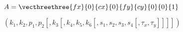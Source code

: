\documentclass{article}
\begin{document}
$A = \vecthreethree{fx}{0}{cx}{0}{fy}{cy}{0}{0}{1}$
\pagebreak

$(k_1, k_2, p_1, p_2[, k_3[, k_4, k_5, k_6 [, s_1, s_2, s_3, s_4[, \tau_x, \tau_y]]]])$
\pagebreak
\end{document}
